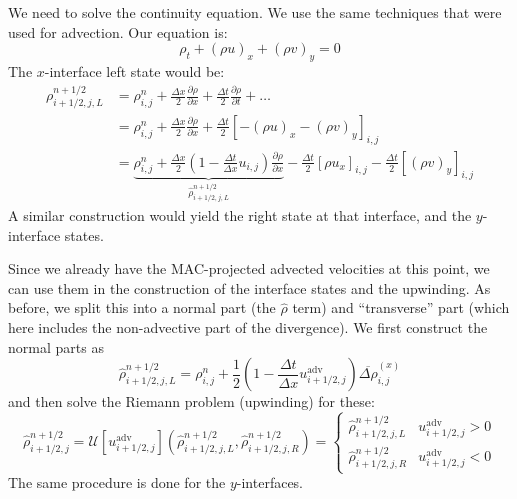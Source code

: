 \label{sec:lm:density}

We need to solve the continuity equation.  We use the same techniques
that were used for advection.  Our equation is:
\begin{equation}
\rho_t + (\rho u)_x + (\rho v)_y = 0
\end{equation}
The $x$-interface left state would be:
\begin{align}
\rho_{i+1/2,j,L}^{n+1/2} &= \rho_{i,j}^n + 
   \frac{\Delta x}{2} \frac{\partial \rho}{\partial x} +
   \frac{\Delta t}{2} \frac{\partial \rho}{\partial t} + \ldots \nonumber \\
%
 &= \rho_{i,j}^n + 
    \frac{\Delta x}{2} \frac{\partial \rho}{\partial x} +
    \frac{\Delta t}{2} \left [ -(\rho u)_x -(\rho v)_y \right ]_{i,j} \nonumber\\
%
 &= \underbrace{\rho_{i,j}^n + 
   \frac{\Delta x}{2} \left ( 1 - \frac{\Delta t}{\Delta x} u_{i,j} \right )
        \frac{\partial \rho}{\partial x}}_{\hat{\rho}_{i+1/2,j,L}^{n+1/2}}
   - \frac{\Delta t}{2} \left [\rho u_x \right ]_{i,j} 
   - \frac{\Delta t}{2} \left [ (\rho v)_y \right ]_{i,j}
\end{align}
A similar construction would yield the right state at that interface, and the
$y$-interface states.

Since we already have the MAC-projected advected velocities at this
point, we can use them in the construction of the interface states and
the upwinding.  As before, we split this into a normal part (the
$\hat{\rho}$ term) and ``transverse'' part (which here includes the
non-advective part of the divergence).  We first construct the normal
parts as
\begin{equation}
\hat{\rho}_{i+1/2,j,L}^{n+1/2} = \rho_{i,j}^n + 
   \frac{1}{2} \left ( 1 - \frac{\Delta t}{\Delta x} u^\mathrm{adv}_{i+1/2,j} \right )
   \overline{\Delta \rho}^{(x)}_{i,j}
\end{equation}
and then solve the Riemann problem (upwinding) for these:
\begin{equation}
\hat{\rho}_{i+1/2,j}^{n+1/2} = 
   \mathcal{U}[u^\mathrm{adv}_{i+1/2,j}](\hat{\rho}_{i+1/2,j,L}^{n+1/2},
                                     \hat{\rho}_{i+1/2,j,R}^{n+1/2}) =
  \left \{
  \begin{array}{cl}
     \hat{\rho}_{i+1/2,j,L}^{n+1/2} & u^\mathrm{adv}_{i+1/2,j} > 0 \\
     \hat{\rho}_{i+1/2,j,R}^{n+1/2} & u^\mathrm{adv}_{i+1/2,j} < 0 
  \end{array} \right .
\end{equation}
The same procedure is done for the $y$-interfaces.


